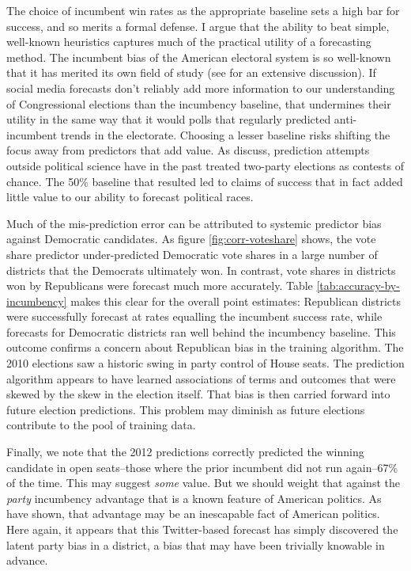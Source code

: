 \documentclass{article}
\begin{document}
The choice of incumbent win rates as the appropriate baseline sets a
high bar for success, and so merits a formal defense. I argue that the
ability to beat simple, well-known heuristics captures much of the
practical utility of a forecasting method. The incumbent bias of the
American electoral system is so well-known that it has merited its own
field of study (see \cite{caughey2011elections} for an extensive
discussion). If social media forecasts don't reliably add more
information to our understanding of Congressional elections than the
incumbency baseline, that undermines their utility in the same way
that it would polls that regularly predicted anti-incumbent trends in
the electorate. Choosing a lesser baseline risks shifting the focus
away from predictors that add value. As \cite{metaxas2011not} discuss,
prediction attempts outside political science have in the past treated
two-party elections as contests of chance. The 50\% baseline that
resulted led to claims of success that in fact added little value to
our ability to forecast political races.

Much of the mis-prediction error can be attributed to systemic
predictor bias against Democratic candidates. As figure
\ref{fig:corr-voteshare} shows, the vote share predictor
under-predicted Democratic vote shares in a large number of districts
that the Democrats ultimately won. In contrast, vote shares in districts
won by Republicans were forecast much more accurately. Table
\ref{tab:accuracy-by-incumbency} makes this clear for the overall
point estimates: Republican districts were successfully forecast at
rates equalling the incumbent success rate, while forecasts for
Democratic districts ran well behind the incumbency baseline. This outcome
confirms a concern about Republican bias in the training
algorithm. The 2010 elections saw a historic swing in party control of
House seats. The prediction algorithm appears to have learned
associations of terms and outcomes that were skewed by the skew in the
election itself. That bias is then carried forward into future
election predictions. This problem
may diminish as future elections contribute to the pool of training data.

Finally, we note that the 2012 predictions correctly predicted the winning
candidate in open seats--those where the prior incumbent did not run
again--67\% of the time. This may suggest \textit{some} value. But we
should weight that against the \textit{party} incumbency
advantage that is a known feature of American politics. As
\cite{caughey2011elections} have shown, that advantage may be an
inescapable fact of American politics. Here again, it appears that
this Twitter-based forecast has simply discovered the latent party
bias in a district, a bias that may have been trivially knowable in
advance. 
\end{document}
